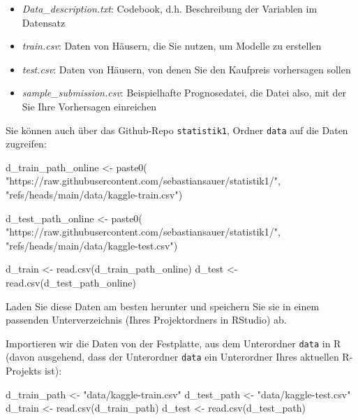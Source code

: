 \documentclass[
  letterpaper,
  twoside,
  open=any]{scrbook}
\newenvironment{Shaded}{\begin{snugshade}}{\end{snugshade}}
\newcommand{\FunctionTok}[1]{\textcolor[rgb]{0.28,0.35,0.67}{#1}}
\newcommand{\NormalTok}[1]{\textcolor[rgb]{0.00,0.23,0.31}{#1}}
\newcommand{\OtherTok}[1]{\textcolor[rgb]{0.00,0.23,0.31}{#1}}
\newcommand{\StringTok}[1]{\textcolor[rgb]{0.13,0.47,0.30}{#1}}
\providecommand{\tightlist}{%
  \setlength{\itemsep}{0pt}\setlength{\parskip}{0pt}}\usepackage{longtable,booktabs,array}
\theoremstyle{definition}
\theoremstyle{definition}
\theoremstyle{definition}
\theoremstyle{remark}
\begin{document}
\begin{itemize}
\tightlist
\item
  \emph{Data\_description.txt}: Codebook, d.h. Beschreibung der
  Variablen im Datensatz
\item
  \emph{train.csv}: Daten von Häusern, die Sie nutzen, um Modelle zu
  erstellen
\item
  \emph{test.csv}: Daten von Häusern, von denen Sie den Kaufpreis
  vorhersagen sollen
\item
  \emph{sample\_submission.csv}: Beispielhafte Prognosedatei, die Datei
  also, mit der Sie Ihre Vorhersagen einreichen
\end{itemize}

Sie können auch über das Github-Repo \texttt{statistik1}, Ordner
\texttt{data} auf die Daten zugreifen:

\begin{Shaded}
\begin{Highlighting}[]
\NormalTok{d\_train\_path\_online }\OtherTok{\textless{}{-}} \FunctionTok{paste0}\NormalTok{(}
    \StringTok{"https://raw.githubusercontent.com/sebastiansauer/statistik1/"}\NormalTok{,}
    \StringTok{"refs/heads/main/data/kaggle{-}train.csv"}\NormalTok{)}

\NormalTok{d\_test\_path\_online }\OtherTok{\textless{}{-}} \FunctionTok{paste0}\NormalTok{(}
\StringTok{"https://raw.githubusercontent.com/sebastiansauer/statistik1/"}\NormalTok{,}
    \StringTok{"refs/heads/main/data/kaggle{-}test.csv"}\NormalTok{)}

\NormalTok{d\_train }\OtherTok{\textless{}{-}} \FunctionTok{read.csv}\NormalTok{(d\_train\_path\_online)}
\NormalTok{d\_test }\OtherTok{\textless{}{-}} \FunctionTok{read.csv}\NormalTok{(d\_test\_path\_online)}
\end{Highlighting}
\end{Shaded}

Laden Sie diese Daten am besten herunter und speichern Sie sie in einem
passenden Unterverzeichnis (Ihres Projektordners in RStudio) ab.

Importieren wir die Daten von der Festplatte, aus dem Unterordner
\texttt{data} in R (davon ausgehend, dass der Unterordner \texttt{data}
ein Unterordner Ihres aktuellen R-Projekts ist):

\begin{Shaded}
\begin{Highlighting}[]
\NormalTok{d\_train\_path }\OtherTok{\textless{}{-}} \StringTok{"data/kaggle{-}train.csv"}
\NormalTok{d\_test\_path }\OtherTok{\textless{}{-}} \StringTok{"data/kaggle{-}test.csv"}
\NormalTok{d\_train }\OtherTok{\textless{}{-}} \FunctionTok{read.csv}\NormalTok{(d\_train\_path)}
\NormalTok{d\_test }\OtherTok{\textless{}{-}} \FunctionTok{read.csv}\NormalTok{(d\_test\_path)}
\end{Highlighting}
\end{Shaded}
\end{document}
